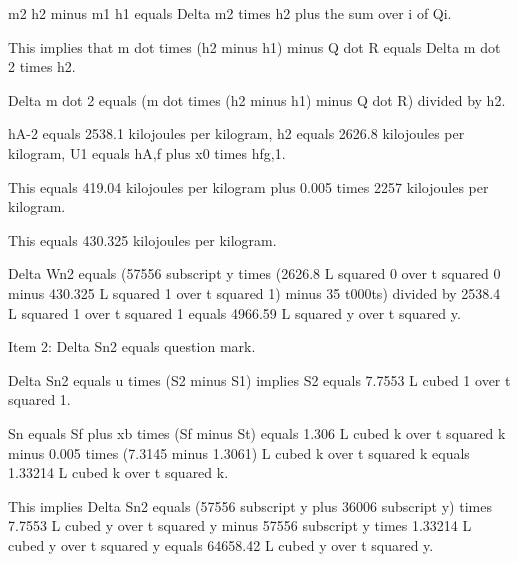 m2 h2 minus m1 h1 equals Delta m2 times h2 plus the sum over i of Qi.

This implies that m dot times (h2 minus h1) minus Q dot R equals Delta m dot 2 times h2.

Delta m dot 2 equals (m dot times (h2 minus h1) minus Q dot R) divided by h2.

hA-2 equals 2538.1 kilojoules per kilogram, h2 equals 2626.8 kilojoules per kilogram, U1 equals hA,f plus x0 times hfg,1.

This equals 419.04 kilojoules per kilogram plus 0.005 times 2257 kilojoules per kilogram.

This equals 430.325 kilojoules per kilogram.

Delta Wn2 equals (57556 subscript y times (2626.8 L squared 0 over t squared 0 minus 430.325 L squared 1 over t squared 1) minus 35 t000ts) divided by 2538.4 L squared 1 over t squared 1 equals 4966.59 L squared y over t squared y.

Item 2: Delta Sn2 equals question mark.

Delta Sn2 equals u times (S2 minus S1) implies S2 equals 7.7553 L cubed 1 over t squared 1.

Sn equals Sf plus xb times (Sf minus St) equals 1.306 L cubed k over t squared k minus 0.005 times (7.3145 minus 1.3061) L cubed k over t squared k equals 1.33214 L cubed k over t squared k.

This implies Delta Sn2 equals (57556 subscript y plus 36006 subscript y) times 7.7553 L cubed y over t squared y minus 57556 subscript y times 1.33214 L cubed y over t squared y equals 64658.42 L cubed y over t squared y.